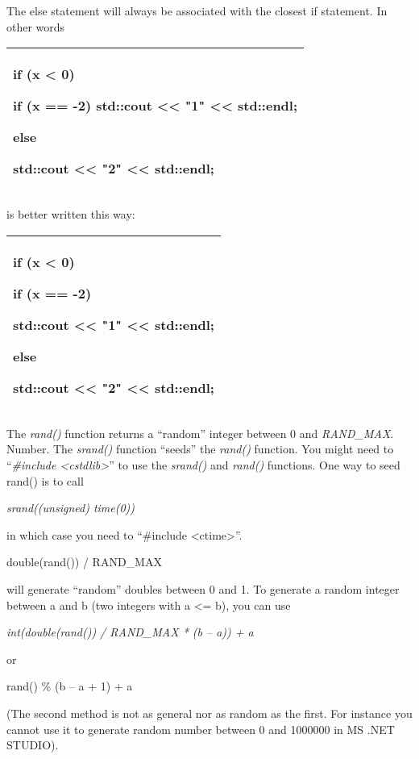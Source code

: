 \documentclass[
]{article}
\begin{document}
The else statement will always be associated with the closest if
statement. In other words

\begin{longtable}[]{@{}l@{}}
\toprule
\endhead
\begin{minipage}[t]{0.97\columnwidth}\raggedright
if (x \textless{} 0)

if (x == -2) std::cout \textless\textless{} "1" \textless\textless{}
std::endl;

else

std::cout \textless\textless{} "2" \textless\textless{} std::endl;\strut
\end{minipage}\tabularnewline
\bottomrule
\end{longtable}

is better written this way:

\begin{longtable}[]{@{}l@{}}
\toprule
\endhead
\begin{minipage}[t]{0.97\columnwidth}\raggedright
if (x \textless{} 0)

if (x == -2)

std::cout \textless\textless{} "1" \textless\textless{} std::endl;

else

std::cout \textless\textless{} "2" \textless\textless{} std::endl;\strut
\end{minipage}\tabularnewline
\bottomrule
\end{longtable}

The \emph{rand()} function returns a ``random'' integer between 0 and
\emph{RAND\_MAX}. Number. The \emph{srand()} function ``seeds'' the
\emph{rand()} function. You might need to ``\emph{\#include
\textless cstdlib\textgreater{}}'' to use the \emph{srand()} and
\emph{rand()} functions. One way to seed rand() is to call

\emph{srand((unsigned) time(0))}

in which case you need to ``\#include \textless ctime\textgreater''.

double(rand()) / RAND\_MAX

will generate ``random'' doubles between 0 and 1. To generate a random
integer between a and b (two integers with a \textless= b), you can use

\emph{int(double(rand()) / RAND\_MAX * (b -- a)) + a}

or

rand() \% (b -- a + 1) + a

(The second method is not as general nor as random as the first. For
instance you cannot use it to generate random number between 0 and
1000000 in MS .NET STUDIO).
\end{document}
